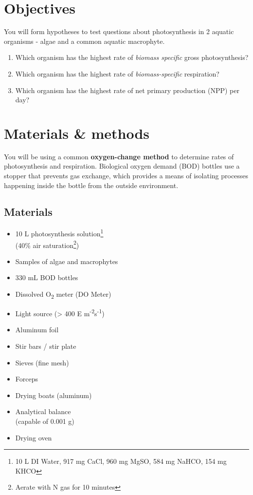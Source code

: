 \documentclass[]{krantz}
\theoremstyle{definition}
\theoremstyle{definition}
\theoremstyle{definition}
\theoremstyle{remark}
\begin{document}
\section{Objectives}\label{objectives-1}

You will form hypotheses to test questions about photosynthesis in 2
aquatic organisms - algae and a common aquatic macrophyte.

\begin{enumerate}
\def\labelenumi{\arabic{enumi}.}
\item
  Which organism has the highest rate of \emph{biomass specific} gross
  photosynthesis?
\item
  Which organism has the highest rate of \emph{biomass-specific}
  respiration?
\item
  Which organism has the highest rate of net primary production (NPP)
  per day?
\end{enumerate}

\section{Materials \& methods}\label{materials-methods}

You will be using a common \textbf{oxygen-change method} to determine
rates of photosynthesis and respiration. Biological oxygen demand (BOD)
bottles use a stopper that prevents gas exchange, which provides a means
of isolating processes happening inside the bottle from the outside
environment.

\pagebreak

\subsection{Materials}\label{materials}

\begin{multicols}{2}
\begin{itemize}{}
  \item 10 L photosynthesis solution\footnote{10 L DI Water, 917 mg CaCl, 960 mg MgSO, 584 mg NaHCO, 154 mg KHCO}\\(40\% air saturation\footnote{Aerate with N gas for 10 minutes})
  \item Samples of algae and macrophytes
  \item 330 mL BOD bottles
  \item Dissolved O\textsubscript{2} meter (DO Meter)
  \item Light source (> 400 \textmu E m\textsuperscript{-2}s\textsuperscript{-1})
  \item Aluminum foil
  \item Stir bars / stir plate
  \item Sieves (fine mesh)
  \item Forceps
  \item Drying boats (aluminum)
  \item Analytical balance \\(capable of 0.001 g)
  \item Drying oven
\end{itemize}
\end{multicols}
\end{document}
